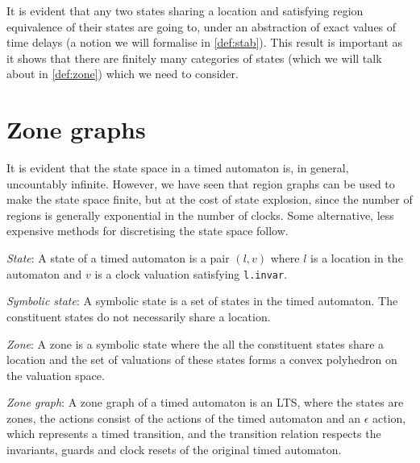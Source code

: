It is evident that any two states sharing a location and satisfying
region equivalence of their states are going to, under an abstraction
of exact values of time delays (a notion we will formalise in
\ref{def:stab}). This result is important as it shows that there are
finitely many categories of states (which we will talk about in
\ref{def:zone}) which we need to consider.

\section{Zone graphs}

It is evident that the state space in a timed automaton is, in
general, uncountably infinite. However, we have seen that region
graphs can be used to make the state space finite, but at the cost of
state explosion, since the number of regions is generally exponential
in the number of clocks. Some alternative, less expensive methods for
discretising the state space follow.

\begin{definition}
  \emph{State}: A state of a timed automaton is a pair $(l, v)$
  where $l$ is a location in the automaton and $v$ is a clock
  valuation satisfying \texttt{l.invar}.
\end{definition}

\begin{definition}
  \emph{Symbolic state}: A symbolic state is a set of states in
  the timed automaton. The constituent states do not necessarily share
  a location.
\end{definition}

\begin{definition}
\label{def:zone}
  \emph{Zone}: A zone is a symbolic state where the all the
  constituent states share a location and the set of valuations of
  these states forms a convex polyhedron on the valuation space.
\end{definition}

\begin{definition}
  \emph{Zone graph}: A zone graph of a timed automaton is an LTS, where
  the states are zones, the actions consist of the actions of the
  timed automaton and an $\epsilon$ action, which represents a timed
  transition, and the transition relation respects the invariants,
  guards and clock resets of the original timed automaton.
\end{definition}

